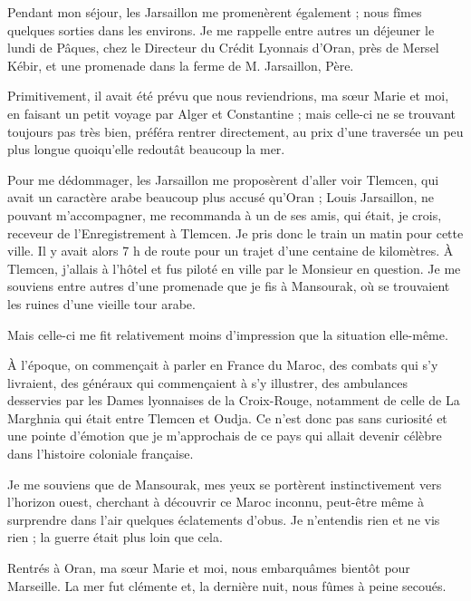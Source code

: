 \documentclass[11pt,a4paper]{report}
\begin{document}
Pendant mon séjour, les Jarsaillon me promenèrent également ; nous fîmes quelques sorties dans les environs. Je me rappelle entre autres un déjeuner le lundi de Pâques, chez le Directeur du Crédit Lyonnais d'Oran, près de Mersel Kébir, et une promenade dans la ferme de M. Jarsaillon, Père.

Primitivement, il avait été prévu que nous reviendrions, ma sœur Marie et moi, en faisant un petit voyage par Alger et Constantine ; mais celle-ci ne se trouvant toujours pas très bien, préféra rentrer directement, au prix d'une traversée un peu plus longue quoiqu'elle redoutât beaucoup la mer.

Pour me dédommager, les Jarsaillon me proposèrent d'aller voir Tlemcen, qui avait un caractère arabe beaucoup plus accusé qu'Oran ; Louis Jarsaillon, ne pouvant m'accompagner, me recommanda à un de ses amis, qui était, je crois, receveur de l'Enregistrement à Tlemcen. Je pris donc le train un matin pour cette ville. Il y avait alors 7 h de route pour un trajet d'une centaine de kilomètres. À Tlemcen, j'allais à l'hôtel et fus piloté en ville par le Monsieur en question. Je me souviens entre autres d'une promenade que je fis à Mansourak, où se trouvaient les ruines d'une vieille tour arabe.

Mais celle-ci me fit relativement moins d'impression que la situation elle-même.


À l'époque, on commençait à parler en France du Maroc, des combats qui s'y livraient, des généraux qui commençaient à s'y illustrer, des ambulances desservies par les Dames lyonnaises de la Croix-Rouge, notamment de celle de La Marghnia qui était entre Tlemcen et Oudja. Ce n'est donc pas sans curiosité et une pointe d'émotion que je m'approchais de ce pays qui allait devenir célèbre dans l'histoire coloniale française.

Je me souviens que de Mansourak, mes yeux se portèrent instinctivement vers l'horizon ouest, cherchant à découvrir ce Maroc inconnu, peut-être même à surprendre dans l'air quelques éclatements d'obus. Je n'entendis rien et ne vis rien ; la guerre était plus loin que cela.

Rentrés à Oran, ma sœur Marie et moi, nous embarquâmes bientôt pour Marseille. La mer fut clémente et, la dernière nuit, nous fûmes à peine secoués.
\end{document}
